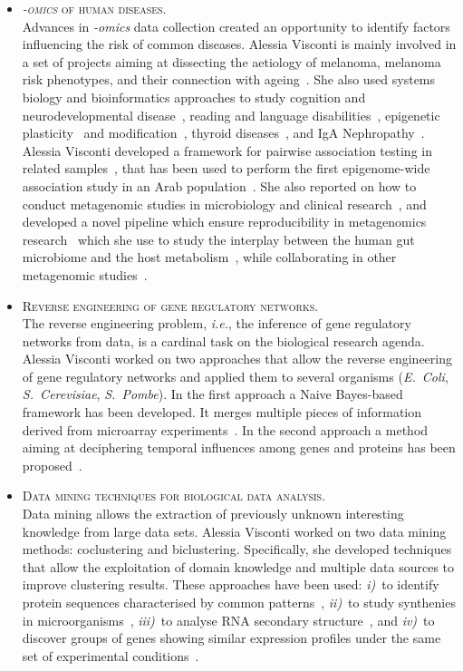 \documentclass[a4paper,10pt]{article}
\newcommand{\smalltitle}[1]{
	\vspace{0.1cm}
	{\noindent 
	\large \textsc{#1}}
	\vspace{0.1cm}
}
\newcommand{\bulletitem}{\item[$\bullet$]}
\begin{document}
\begin{itemize}
	
\bulletitem \smalltitle{\emph{-omics} of human diseases.}\\
Advances in \emph{-omics} data collection created an opportunity to identify factors influencing the risk of common diseases. Alessia Visconti is mainly involved in a set of projects aiming at dissecting the aetiology of melanoma, melanoma risk phenotypes, and their connection with ageing~\cite{Rib16,Pui16,Hys18,Vis18a,Duf17,Vis19a,Vis20,Lan20,San20,Swi15}. 
She also used systems biology and bioinformatics approaches to study cognition and neurodevelopmental disease~\cite{Joh15,Cul18}, reading and language disabilities~\cite{Gia16}, epigenetic plasticity~\cite{Car16} and modification~\cite{Zag18}, thyroid diseases~\cite{Mar20}, and IgA Nephropathy~\cite{Lom16}. 
Alessia Visconti developed a framework for pairwise association testing in related samples~\cite{Vis16}, that has been used to perform the first epigenome-wide association study in an Arab population~\cite{AlM15}. 
She also reported on how to conduct metagenomic studies in microbiology and clinical research~\cite{Vis18c}, and developed a novel pipeline which ensure reproducibility in metagenomics research~\cite{Vis18b} which she use to study the interplay between the human gut microbiome and the host metabolism~\cite{Vis19}, while collaborating in other metagenomic studies~\cite{Bar20}.
	
\bulletitem \smalltitle{Reverse engineering of gene regulatory networks.}\\
The reverse engineering problem, \emph{i.e.}, the inference of gene regulatory networks from data, is a cardinal task on the biological research agenda.
Alessia Visconti worked on two approaches that allow the reverse engineering of gene regulatory networks and applied them to several organisms (\emph{E.~Coli}, \emph{S.~Cerevisiae}, \emph{S.~Pombe}). In the first approach a Naive Bayes-based framework has been developed. It merges multiple pieces of information derived from microarray experiments~\cite{Mar12, Vis11b}. In the second approach a method aiming at deciphering temporal influences among genes and proteins has been proposed~\cite{Vis12b}. 

\bulletitem \smalltitle{Data mining techniques for biological data analysis.}\\
Data mining allows the extraction of previously unknown interesting knowledge from large data sets.
Alessia Visconti worked on two data mining methods: coclustering and biclustering. Specifically, she developed techniques that allow the exploitation of domain knowledge and multiple data sources to improve clustering results.
These approaches have been used: \emph{i)}~to identify protein sequences characterised by common patterns~\cite{Vis08, Cor09a, Cor08b}, \emph{ii)}~to study synthenies in microorganisms~\cite{Bon11}, \emph{iii)}~to analyse RNA secondary structure~\cite{Cor08a}, and \emph{iv)}~to discover groups of genes showing similar expression profiles under the same set of experimental conditions~\cite{Vis13a, Cor09b, Vis11c, Vis12b}.


\end{itemize}
\end{document}
